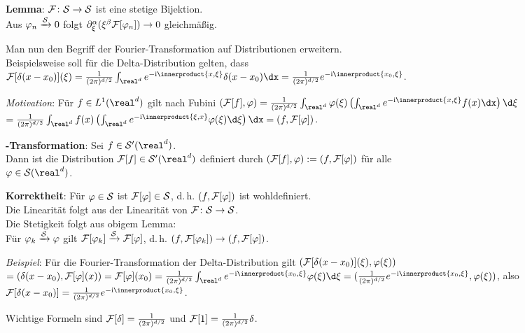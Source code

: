 \textbf{Lemma}: $\F\colon \S \rightarrow \S$ ist eine stetige Bijektion.\\
Aus $\varphi_n \xrightarrow{\S} 0$ folgt
$\partial^\alpha_\xi (\xi^\beta \F[\varphi_n]) \to 0$ gleichmäßig.

Man nun den Begriff der Fourier-Transformation auf Distributionen erweitern.\\
Beispielsweise soll für die Delta-Distribution gelten, dass\\
$\F[\delta(x - x_0)](\xi) = \frac{1}{(2\pi)^{d/2}}
\int_{\real^d} e^{-\i\innerproduct{x, \xi}}\delta(x - x_0)\dx =
\frac{1}{(2\pi)^{d/2}} e^{-\i\innerproduct{x_0, \xi}}$.

\linie

\emph{Motivation}:
Für $f \in L^1(\real^d)$ gilt nach Fubini
$(\F[f], \varphi) = \frac{1}{(2\pi)^{d/2}} \int_{\real^d} \varphi(\xi)
\left(\int_{\real^d} e^{-\i\innerproduct{x, \xi}}f(x)\dx\right) \d\xi$\\
$= \frac{1}{(2\pi)^{d/2}} \int_{\real^d} f(x)
\left(\int_{\real^d} e^{-\i\innerproduct{\xi, x}}\varphi(\xi)\d\xi\right) \dx =
(f, \F[\varphi])$.

\textbf{-Transformation}:
Sei $f \in \S'(\real^d)$.\\
Dann ist die Distribution $\F[f] \in \S'(\real^d)$ definiert durch
$(\F[f], \varphi) := (f, \F[\varphi])$ für alle\\
$\varphi \in \S(\real^d)$.

\textbf{Korrektheit}:
Für $\varphi \in \S$ ist $\F[\varphi] \in \S$, d.\,h.
$(f, \F[\varphi])$ ist wohldefiniert.\\
Die Linearität folgt aus der Linearität von $\F\colon \S \rightarrow \S$.\\
Die Stetigkeit folgt aus obigem Lemma:\\
Für $\varphi_k \xrightarrow{\S} \varphi$ gilt
$\F[\varphi_k] \xrightarrow{\S} \F[\varphi]$, d.\,h.
$(f, \F[\varphi_k]) \to (f, \F[\varphi])$.

\emph{Beispiel}:
Für die Fourier-Transformation der Delta-Distribution gilt
$(\F[\delta(x - x_0)](\xi), \varphi(\xi))$\\
$= (\delta(x - x_0), \F[\varphi](x)) = \F[\varphi](x_0) =
\frac{1}{(2\pi)^{d/2}} \int_{\real^d} e^{-\i\innerproduct{x_0, \xi}}\varphi(\xi)\d\xi =
(\frac{1}{(2\pi)^{d/2}} e^{-\i\innerproduct{x_0, \xi}}, \varphi(\xi))$, also\\
$\F[\delta(x - x_0)] = \frac{1}{(2\pi)^{d/2}} e^{-\i\innerproduct{x_0, \xi}}$.

Wichtige Formeln sind $\F[\delta] = \frac{1}{(2\pi)^{d/2}}$ und
$\F[1] = \frac{1}{(2\pi)^{d/2}} \delta$.

